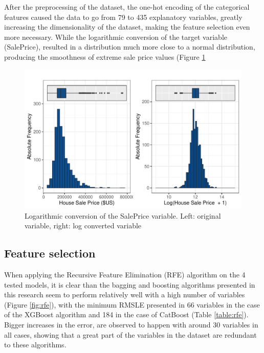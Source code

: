 \documentclass[11pt,onecolumn,titlepage,letterpaper]{article}
\begin{document}
After the preprocessing of the dataset, the one-hot encoding of the categorical features caused the data to go from 79 to 435 explanatory variables, greatly increasing the dimensionality of the dataset, making the feature selection even more necessary. While the logarithmic conversion of the target variable (SalePrice), resulted in a distribution much more close to a normal distribution, producing the smoothness of extreme sale price values (Figure \ref{fig:log}

\begin{figure}[H]
	\begin{center}
		\includegraphics[width=1.0\linewidth]{2hist_saleprice.pdf}
	\end{center}
	\caption{Logarithmic conversion of the SalePrice variable. Left: original variable, right: log converted variable}
	\label{fig:log}
\end{figure}


\subsection{Feature selection}

When applying the Recursive Feature Elimination (RFE) algorithm on the 4 tested models, it is clear than the bagging and boosting algorithms presented in this research seem to perform relatively well with a high number of variables (Figure \ref{fig:rfe}), with the minimum RMSLE presented in 66 variables in the case  of the XGBoost algorithm and 184 in the case of CatBoost (Table \ref{table:rfe}). Bigger increases in the error, are observed to happen with around 30 variables in all cases, showing that a great part of the variables in the dataset are redundant to these algorithms.
\end{document}
